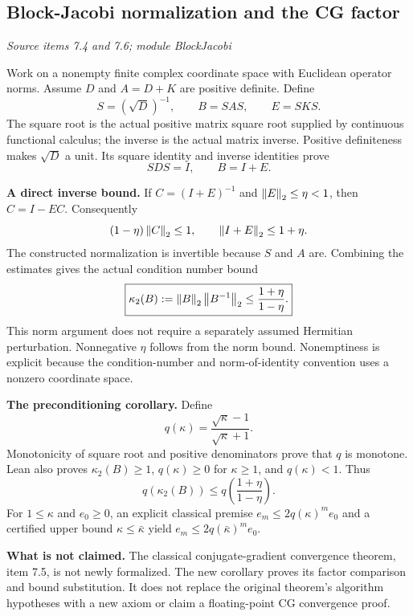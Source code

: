 \subsection{Block-Jacobi normalization and the CG factor}\label{supp5:subsection:006}\textit{Source items 7.4 and 7.6; module BlockJacobi}\par
Work on a nonempty finite complex coordinate space with Euclidean operator norms. Assume $D$ and $A=D+K$ are positive definite. Define
\[
S=(\sqrt D)^{-1},\qquad B=SAS,\qquad E=SKS.
\]
The square root is the actual positive matrix square root supplied by continuous functional calculus; the inverse is the actual matrix inverse. Positive definiteness makes $\sqrt D$ a unit. Its square identity and inverse identities prove
\[
SDS=I,\qquad B=I+E.
\]

\textbf{A direct inverse bound.} If $C=(I+E)^{-1}$ and $\left\lVert E\right\rVert_2\leq\eta<1$, then $C=I-EC$. Consequently
\[
(1-\eta)\left\lVert C\right\rVert_2\leq 1,
\qquad \left\lVert I+E\right\rVert_2\leq 1+\eta.
\]
The constructed normalization is invertible because $S$ and $A$ are. Combining the estimates gives the actual condition number bound
\[
\boxed{\kappa_2(B):=\left\lVert B\right\rVert_2\left\lVert B^{-1}\right\rVert_2
\leq\frac{1+\eta}{1-\eta}.}
\]
This norm argument does not require a separately assumed Hermitian perturbation. Nonnegative $\eta$ follows from the norm bound. Nonemptiness is explicit because the condition-number and norm-of-identity convention uses a nonzero coordinate space.

\textbf{The preconditioning corollary.} Define
\[
q(\kappa)=\frac{\sqrt\kappa-1}{\sqrt\kappa+1}.
\]
Monotonicity of square root and positive denominators prove that $q$ is monotone. Lean also proves $\kappa_2(B)\geq1$, $q(\kappa)\geq0$ for $\kappa\geq1$, and $q(\kappa)<1$. Thus
\[
\boxed{q(\kappa_2(B))\leq q\!\left(\frac{1+\eta}{1-\eta}\right).}
\]
For $1\leq\kappa$ and $e_0\geq0$, an explicit classical premise $e_m\leq2q(\kappa)^m e_0$ and a certified upper bound $\kappa\leq\bar\kappa$ yield $e_m\leq2q(\bar\kappa)^m e_0$.

\textbf{What is not claimed.} The classical conjugate-gradient convergence theorem, item 7.5, is not newly formalized. The new corollary proves its factor comparison and bound substitution. It does not replace the original theorem's algorithm hypotheses with a new axiom or claim a floating-point CG convergence proof.



